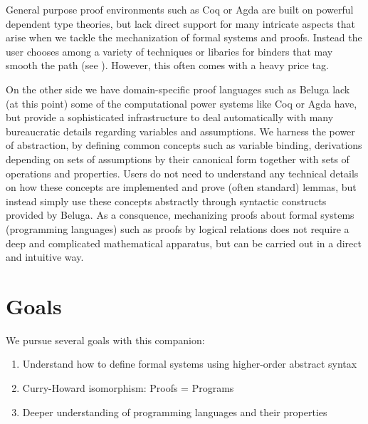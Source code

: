 General purpose proof environments such as Coq or Agda are built on powerful dependent type theories, but lack direct support for many intricate aspects that arise when we tackle the mechanization of formal systems and proofs. Instead the user chooses among a variety of techniques or libaries for binders that may smooth the path (see \cite{Aydemir:TechReport09}). However, this often comes with a heavy price tag.

On the other side we have domain-specific proof languages such as Beluga \citep{Pientka:POPL08,Pientka:PPDP08,Pientka:IJCAR10,Cave:POPL12} lack (at this point) some of the computational power systems like Coq or Agda have, but provide a sophisticated infrastructure to deal automatically with many bureaucratic details regarding variables and  assumptions. We harness the power of abstraction, by defining common concepts such as variable binding, derivations depending on sets of assumptions by their canonical form together with sets of operations and properties. Users do not need to understand any technical details on how these concepts are implemented and prove (often standard) lemmas, but instead simply use these concepts abstractly through syntactic constructs provided by Beluga. As a consquence, mechanizing proofs about formal systems (programming languages) such as proofs by logical relations does not require a deep and complicated mathematical apparatus, but can be carried out in a direct and intuitive way. 

\section{Goals}
We pursue several goals with this companion:

\begin{enumerate}
\item Understand how to define formal systems using higher-order abstract syntax  
\item Curry-Howard isomorphism: Proofs = Programs  
\item Deeper understanding of programming languages and their properties
\end{enumerate}



